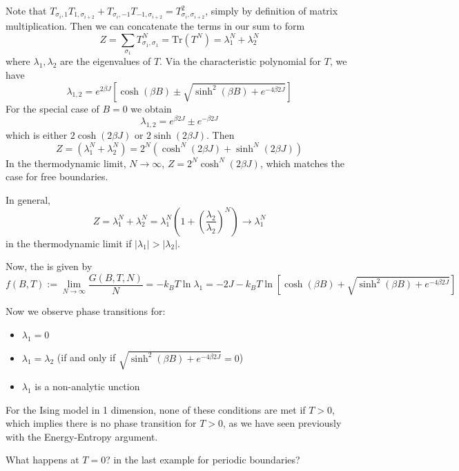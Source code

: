 \documentclass[12pt, a4paper, oneside, openright, titlepage]{book}
\begin{document}
\begin{eg}
\begin{itemize}
\begin{equation*}
            \end{equation*}
            Note that $T_{\sigma_i,1}T_{1,\sigma_{i+2}}+T_{\sigma_i,-1}T_{-1,\sigma_{i+2}} = T^2_{\sigma_i,\sigma_{i+2}}$, simply by definition of matrix multiplication. Then we can concatenate the terms in our sum to form $$Z = \sum_{\sigma_1}T^N_{\sigma_1,\sigma_1} = \text{Tr}(T^N) = \lambda_1^N+\lambda_2^N$$ where $\lambda_1,\lambda_2$ are the eigenvalues of $T$. Via the characteristic polynomial for $T$, we have $$\lambda_{1,2} = e^{2\beta J}\left[\cosh(\beta B) \pm\sqrt{\sinh^2(\beta B)+e^{-4\beta 2J}}\right]$$ 
            For the special case of $B = 0$ we obtain $$\lambda_{1,2} = e^{\beta 2J}\pm e^{-\beta 2J}$$ which is either $2\cosh(2\beta J)$ or $2\sinh(2\beta J)$. Then $$Z = (\lambda_1^N+\lambda_2^N) = 2^N(\cosh^N(2\beta J)+\sinh^N(2\beta J))$$ 
            In the thermodynamic limit, $N\rightarrow \infty$, $Z = 2^N\cosh^N(2 \beta J)$, which matches the case for free boundaries.

            In general, $$Z = \lambda_1^N+\lambda_2^N = \lambda_1^N(1+\left(\frac{\lambda_2}{\lambda_2}\right)^N)\rightarrow \lambda_1^N$$ in the thermodynamic limit if $|\lambda_1| > |\lambda_2|$.

            Now, the  is given by $$f(B,T) := \lim\limits_{N\rightarrow \infty}\frac{G(B,T,N)}{N} = -k_BT\ln\lambda_1 = -2J-k_BT\ln\left[\cosh(\beta B)+\sqrt{\sinh^2(\beta B)+e^{-4\beta 2J}}\right]$$

            Now we observe phase transitions for:\begin{itemize}
                \item $\lambda_1 = 0$
                \item $\lambda_1 = \lambda_2$ (if and only if $\sqrt{\sinh^2(\beta B)+e^{-4\beta 2J}} = 0$)
                \item $\lambda_1$ is a non-analytic unction
            \end{itemize}
            For the Ising model in 1 dimension, none of these conditions are met if $T > 0$, which implies there is no phase transition for $T > 0$, as we have seen previously with the Energy-Entropy argument.
    \end{itemize}
\end{eg}

 
\begin{qst}
    What happens at $T = 0$? in the last example for periodic boundaries?
\end{qst}
\end{document}
